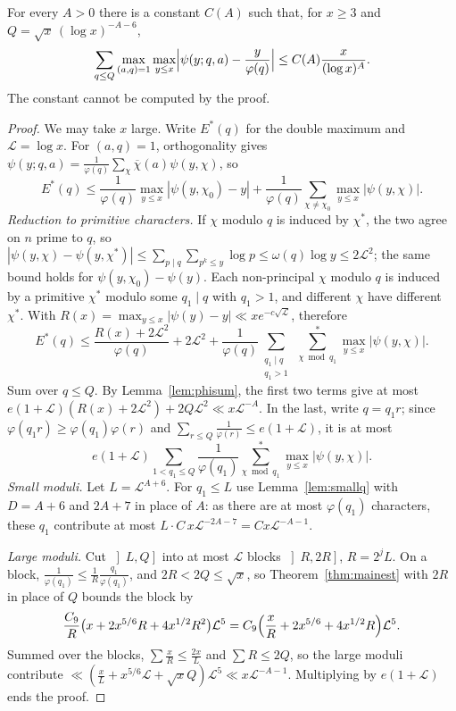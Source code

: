 \begin{theorem}\label{thm:bv}
For every $A>0$ there is a constant $C(A)$ such that, for $x\ge3$ and $Q=\sqrt x\,(\log x)^{-A-6}$,
\[
\sum_{q\le Q}\max_{(a,q)=1}\max_{y\le x}\Bigl|\psi(y;q,a)-\frac y{\varphi(q)}\Bigr|\le C(A)\frac x{(\log x)^A}.
\]
The constant cannot be computed by the proof.
\end{theorem}
\begin{proof}
We may take $x$ large. Write $E^*(q)$ for the double maximum and $\mathcal L=\log x$. For $(a,q)=1$, orthogonality gives $\psi(y;q,a)=\frac1{\varphi(q)}\sum_\chi\overline\chi(a)\psi(y,\chi)$, so
\[
E^*(q)\le\frac1{\varphi(q)}\max_{y\le x}|\psi(y,\chi_0)-y|+\frac1{\varphi(q)}\sum_{\chi\ne\chi_0}\max_{y\le x}|\psi(y,\chi)|.
\]
\emph{Reduction to primitive characters.} If $\chi$ modulo $q$ is induced by $\chi^*$, the two agree on $n$ prime to $q$, so $|\psi(y,\chi)-\psi(y,\chi^*)|\le\sum_{p\mid q}\sum_{p^k\le y}\log p\le\omega(q)\log y\le2\mathcal L^2$; the same bound holds for $\psi(y,\chi_0)-\psi(y)$. Each non-principal $\chi$ modulo $q$ is induced by a primitive $\chi^*$ modulo some $q_1\mid q$ with $q_1>1$, and different $\chi$ have different $\chi^*$. With $R(x)=\max_{y\le x}|\psi(y)-y|\ll xe^{-c\sqrt{\mathcal L}}$, therefore
\[
E^*(q)\le\frac{R(x)+2\mathcal L^2}{\varphi(q)}+2\mathcal L^2+\frac1{\varphi(q)}\sum_{\substack{q_1\mid q\\q_1>1}}\ \sum^*_{\chi\bmod q_1}\max_{y\le x}|\psi(y,\chi)|.
\]
Sum over $q\le Q$. By Lemma~\ref{lem:phisum}, the first two terms give at most $e(1+\mathcal L)(R(x)+2\mathcal L^2)+2Q\mathcal L^2\ll x\mathcal L^{-A}$. In the last, write $q=q_1r$; since $\varphi(q_1r)\ge\varphi(q_1)\varphi(r)$ and $\sum_{r\le Q}\frac1{\varphi(r)}\le e(1+\mathcal L)$, it is at most
\[
e(1+\mathcal L)\sum_{1<q_1\le Q}\frac1{\varphi(q_1)}\sum^*_{\chi\bmod q_1}\max_{y\le x}|\psi(y,\chi)|.
\]
\emph{Small moduli.} Let $L=\mathcal L^{A+6}$. For $q_1\le L$ use Lemma~\ref{lem:smallq} with $D=A+6$ and $2A+7$ in place of $A$: as there are at most $\varphi(q_1)$ characters, these $q_1$ contribute at most $L\cdot C\,x\mathcal L^{-2A-7}=Cx\mathcal L^{-A-1}$.

\emph{Large moduli.} Cut $\left]L,Q\right]$ into at most $\mathcal L$ blocks $\left]R,2R\right]$, $R=2^jL$. On a block, $\frac1{\varphi(q_1)}\le\frac1R\frac{q_1}{\varphi(q_1)}$, and $2R<2Q\le\sqrt x$, so Theorem~\ref{thm:mainest} with $2R$ in place of $Q$ bounds the block by
\[
\frac{C_9}R\bigl(x+2x^{5/6}R+4x^{1/2}R^2\bigr)\mathcal L^5=C_9\Bigl(\frac xR+2x^{5/6}+4x^{1/2}R\Bigr)\mathcal L^5.
\]
Summed over the blocks, $\sum\frac xR\le\frac{2x}L$ and $\sum R\le2Q$, so the large moduli contribute $\ll(\frac xL+x^{5/6}\mathcal L+\sqrt xQ)\mathcal L^5\ll x\mathcal L^{-A-1}$. Multiplying by $e(1+\mathcal L)$ ends the proof.
\end{proof}

